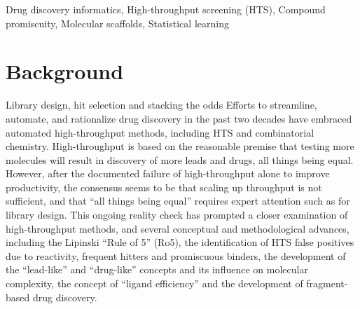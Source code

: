 Drug discovery informatics, High-throughput screening (HTS), Compound promiscuity, Molecular scaffolds, Statistical learning

\section{Background}

Library design, hit selection and stacking the odds
Efforts to streamline, automate, and rationalize drug discovery in the past two decades have embraced automated high-throughput methods, including HTS and combinatorial chemistry. High-throughput is based on the reasonable premise that testing more molecules will result in discovery of more leads and drugs, all things being equal. However, after the documented failure of high-throughput alone to improve productivity, the consensus seems to be that scaling up throughput is not sufficient, and that “all things being equal” requires expert attention such as for library design. This ongoing reality check has prompted a closer examination of high-throughput methods, and several conceptual and methodological advances, including the Lipinski “Rule of 5” (Ro5)\cite{Lipinski1997-vm}, the identification of HTS false positives due to reactivity\cite{Rishton1997-ns}, frequent hitters\cite{Roche2002-ii} and promiscuous binders\cite{McGovern2003-nc,Seidler2003-na}, the development of the “lead-like” and “drug-like” concepts\cite{Teague1999-ce,Oprea2010-kd,Ajay1998-ju,Sadowski1998-uq} and its influence on molecular complexity\cite{Hann2001-qd}, the concept of “ligand efficiency”\cite{Hopkins2004-qj} and the development of fragment-based drug discovery\cite{Jahnke2006-zd,Hajduk2007-ry}.

